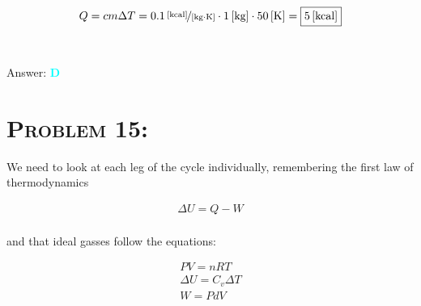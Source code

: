 \documentclass{article}
\begin{document}
\begin{gather}
Q = c m \Delta T = \unitfrac[0.1]{[kcal]}{[kg \cdot K]} \cdot \unit[1]{[kg]} \cdot \unit[50]{[K]} = \boxed{\unit[5]{[kcal]}}\nonumber
\end{gather}
\\\\
Answer: \textbf{\textcolor{cyan}D}\\


\section{\textsc{Problem 15:}} We need to look at each leg of the cycle individually, remembering the first law of thermodynamics

\begin{gather}
\Delta U = Q - W
\end{gather}
\\
and that ideal gasses follow the equations:

\begin{gather}
PV = nRT\\
\Delta U = C_{v} \Delta T\\
W = P dV
\end{gather}
\\
\end{document}
